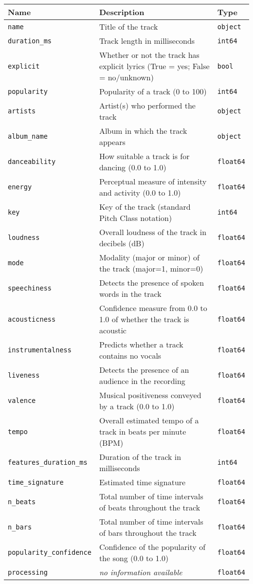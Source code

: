\begin{footnotesize}
\begin{longtable}{|p{5cm}|p{6cm}|p{2cm}|}
\hline
\textbf{Name} & \textbf{Description} & \textbf{Type} \\
\hline
\endhead
\texttt{name} & Title of the track & \texttt{object}\\
\texttt{duration\_ms} & Track length in milliseconds & \texttt{int64} \\
\texttt{explicit} & Whether or not the track has explicit lyrics (True = yes; False = no/unknown) & \texttt{bool} \\
\texttt{popularity} & Popularity of a track (0 to 100) & \texttt{int64} \\
\texttt{artists} & Artist(s) who performed the track & \texttt{object} \\
\texttt{album\_name} & Album in which the track appears & \texttt{object} \\
\texttt{danceability} & How suitable a track is for dancing (0.0 to 1.0) & \texttt{float64} \\
\texttt{energy} & Perceptual measure of intensity and activity (0.0 to 1.0) & \texttt{float64} \\
\texttt{key} & Key of the track (standard Pitch Class notation) & \texttt{int64} \\
\texttt{loudness} & Overall loudness of the track in decibels (dB) & \texttt{float64} \\
\texttt{mode} & Modality (major or minor) of the track (major=1, minor=0) & \texttt{float64} \\
\texttt{speechiness} & Detects the presence of spoken words in the track & \texttt{float64} \\
\texttt{acousticness} & Confidence measure from 0.0 to 1.0 of whether the track is acoustic & \texttt{float64} \\
\texttt{instrumentalness} & Predicts whether a track contains no vocals & \texttt{float64} \\
\texttt{liveness} & Detects the presence of an audience in the recording & \texttt{float64} \\
\texttt{valence} & Musical positiveness conveyed by a track (0.0 to 1.0)& \texttt{float64} \\
\texttt{tempo} & Overall estimated tempo of a track in beats per minute (BPM) & \texttt{float64} \\
\texttt{features\_duration\_ms} & Duration of the track in milliseconds & \texttt{int64}\\
\texttt{time\_signature} & Estimated time signature & \texttt {float64}\\
\texttt{n\_beats} & Total number of time intervals of beats throughout the track & \texttt {float64}\\
\texttt{n\_bars} & Total number of time intervals of bars throughout the track & \texttt {float64}\\
\texttt {popularity\_confidence} & Confidence of the popularity of the song (0.0 to 1.0) & \texttt {float64}\\
\texttt{processing} & \textit{no information available}& \texttt{float64}\\
\hline
\end{longtable}
\end{footnotesize}
